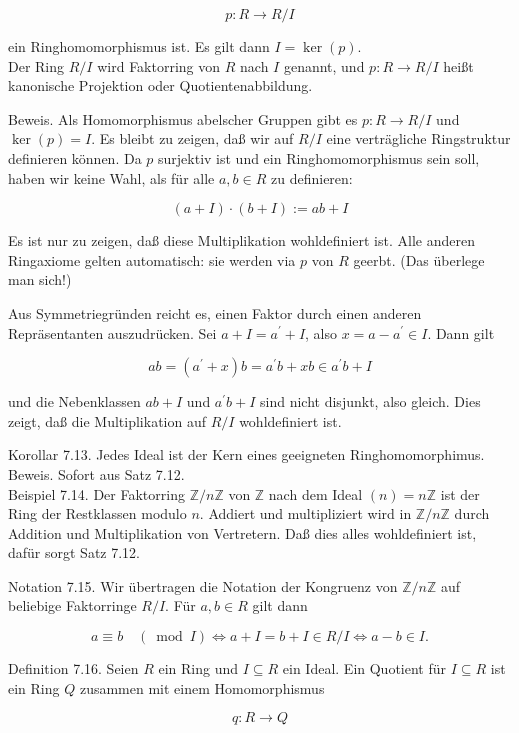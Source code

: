 \documentclass[10pt, letterpaper]{article}
\begin{document}
$$
p: R \rightarrow R / I
$$

ein Ringhomomorphismus ist. Es gilt dann $I=\operatorname{ker}(p)$.\\
Der Ring $R / I$ wird Faktorring von $R$ nach $I$ genannt, und $p: R \rightarrow R / I$ heißt kanonische Projektion oder Quotientenabbildung.

Beweis. Als Homomorphismus abelscher Gruppen gibt es $p: R \rightarrow R / I$ und $\operatorname{ker}(p)=I$. Es bleibt zu zeigen, daß wir auf $R / I$ eine verträgliche Ringstruktur definieren können. Da $p$ surjektiv ist und ein Ringhomomorphismus sein soll, haben wir keine Wahl, als für alle $a, b \in R$ zu definieren:

$$
(a+I) \cdot(b+I):=a b+I
$$

Es ist nur zu zeigen, daß diese Multiplikation wohldefiniert ist. Alle anderen Ringaxiome gelten automatisch: sie werden via $p$ von $R$ geerbt. (Das überlege man sich!)

Aus Symmetriegründen reicht es, einen Faktor durch einen anderen Repräsentanten auszudrücken. Sei $a+I=a^{\prime}+I$, also $x=a-a^{\prime} \in I$. Dann gilt

$$
a b=\left(a^{\prime}+x\right) b=a^{\prime} b+x b \in a^{\prime} b+I
$$

und die Nebenklassen $a b+I$ und $a^{\prime} b+I$ sind nicht disjunkt, also gleich. Dies zeigt, daß die Multiplikation auf $R / I$ wohldefiniert ist.

Korollar 7.13. Jedes Ideal ist der Kern eines geeigneten Ringhomomorphimus.\\
Beweis. Sofort aus Satz 7.12.\\
Beispiel 7.14. Der Faktorring $\mathbb{Z} / n \mathbb{Z}$ von $\mathbb{Z}$ nach dem Ideal $(n)=n \mathbb{Z}$ ist der Ring der Restklassen modulo $n$. Addiert und multipliziert wird in $\mathbb{Z} / n \mathbb{Z}$ durch Addition und Multiplikation von Vertretern. Daß dies alles wohldefiniert ist, dafür sorgt Satz 7.12.

Notation 7.15. Wir übertragen die Notation der Kongruenz von $\mathbb{Z} / n \mathbb{Z}$ auf beliebige Faktorringe $R / I$. Für $a, b \in R$ gilt dann

$$
a \equiv b \quad(\bmod I) \Longleftrightarrow a+I=b+I \in R / I \Longleftrightarrow a-b \in I .
$$

Definition 7.16. Seien $R$ ein Ring und $I \subseteq R$ ein Ideal. Ein Quotient für $I \subseteq R$ ist ein Ring $Q$ zusammen mit einem Homomorphismus

$$
q: R \rightarrow Q
$$
\end{document}
